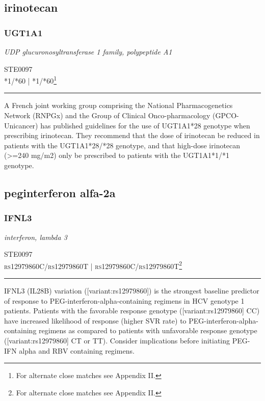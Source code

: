 \documentclass{report}
\begin{document}
\subsection{ irinotecan }

\subsubsection{ UGT1A1 }
     \textit{ UDP glucuronosyltransferase 1 family, polypeptide A1 } \begin{flushright} \textsc{ STE0097 \\ *1/*60  | *1/*60\footnote{For alternate close matches see Appendix II.} }\end{flushright}
      \hrule \vspace{6pt}
      A French joint working group comprising the National Pharmacogenetics Network (RNPGx) and the Group of Clinical Onco-pharmacology (GPCO-Unicancer) has published guidelines for the use of UGT1A1*28 genotype when prescribing irinotecan. They recommend that the dose of irinotecan be reduced in patients with the UGT1A1*28/*28 genotype, and that high-dose irinotecan (>=240 mg/m2) only be prescribed to patients with the UGT1A1*1/*1 genotype. \newline
      \scriptsize
      
      \newpage
      \normalsize





\subsection{ peginterferon alfa-2a }

\subsubsection{ IFNL3 }
     \textit{ interferon, lambda 3 } \begin{flushright} \textsc{ STE0097 \\ rs12979860C/rs12979860T  | rs12979860C/rs12979860T\footnote{For alternate close matches see Appendix II.} }\end{flushright}
      \hrule \vspace{6pt}
      IFNL3 (IL28B) variation ([variant:rs12979860]) is the strongest baseline predictor of response to PEG-interferon-alpha-containing regimens in HCV genotype 1 patients.  Patients with the favorable response genotype ([variant:rs12979860] CC) have increased likelihood of response (higher SVR rate) to PEG-interferon-alpha-containing regimens as compared to patients with unfavorable response genotype ([variant:rs12979860] CT or TT). Consider implications before initiating PEG-IFN alpha and RBV containing regimens. \newline
      \scriptsize
      
\end{document}
